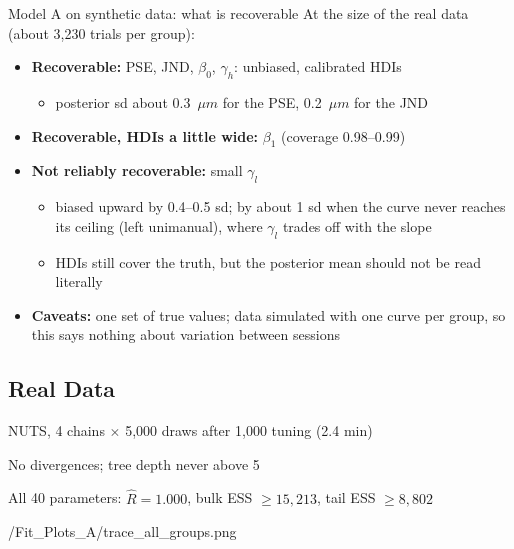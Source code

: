 \begin{frame}{Model A on synthetic data: what is recoverable}
  At the size of the real data (about 3{,}230 trials per group):
  \begin{itemize}
    \item \textbf{Recoverable:} PSE, JND, $\beta_0$, $\gamma_h$: unbiased, calibrated HDIs
    \begin{itemize}
      \item posterior sd about 0.3~$\mu m$ for the PSE, 0.2~$\mu m$ for the JND
    \end{itemize}
    \item \textbf{Recoverable, HDIs a little wide:} $\beta_1$ (coverage 0.98--0.99)
    \item \textbf{Not reliably recoverable:} small $\gamma_l$
    \begin{itemize}
      \item biased upward by 0.4--0.5 sd; by about 1 sd when the curve never reaches its
            ceiling (left unimanual), where $\gamma_l$ trades off with the slope
      \item HDIs still cover the truth, but the posterior mean should not be read literally
    \end{itemize}
    \item \textbf{Caveats:} one set of true values; data simulated with one curve per group,
          so this says nothing about variation between sessions
  \end{itemize}
\end{frame}

\subsection{Real Data}

  {\item NUTS, 4 chains $\times$ 5{,}000 draws after 1{,}000 tuning (2.4 min)
   \item No divergences; tree depth never above 5
   \item All 40 parameters: $\hat{R} = 1.000$, bulk ESS $\ge 15{,}213$, tail ESS $\ge 8{,}802$}
  {\plotsA/Fit_Plots_A/trace_all_groups.png}


